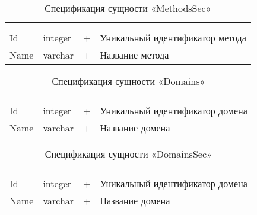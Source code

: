 \begin{xltabular}{\textwidth}{|X|X|X|X|}
	\caption{Спецификация сущности «MethodsSec»}\label{indexer_methods_sec:table}\\ \hline
	 &  &  &  \\ \hline
	 &  &  &  \\ \hline
	\endfirsthead
	 \hline
	 &  &  &  \\ \hline
	\endhead
	Id & integer & + & Уникальный идентификатор метода \\ \hline
	Name & varchar & + & Название метода \\ \hline
\end{xltabular}

\begin{xltabular}{\textwidth}{|X|X|X|X|}
	\caption{Спецификация сущности «Domains»}\label{indexer_domains:table}\\ \hline
	 &  &  &  \\ \hline
	 &  &  &  \\ \hline
	\endfirsthead
	 \hline
	 &  &  &  \\ \hline
	\endhead
	Id & integer & + & Уникальный идентификатор домена \\ \hline
	Name & varchar & + & Название домена \\ \hline
\end{xltabular}

\begin{xltabular}{\textwidth}{|X|X|X|X|}
	\caption{Спецификация сущности «DomainsSec»}\label{indexer_domains_sec:table}\\ \hline
	 &  &  &  \\ \hline
	 &  &  &  \\ \hline
	\endfirsthead
	 \hline
	 &  &  &  \\ \hline
	\endhead
	Id & integer & + & Уникальный идентификатор домена \\ \hline
	Name & varchar & + & Название домена \\ \hline
\end{xltabular}

